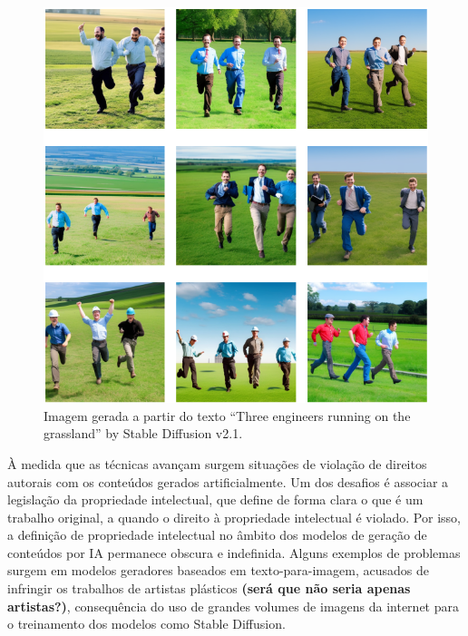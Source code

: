 \begin{figure}
  \centering 
  \includegraphics[scale=0.47]{images_generated_with_text_three_engineers.png}
  \caption{Imagem gerada a partir do texto ``Three engineers running on the grassland'' \space  by Stable Diffusion v2.1.}
  \label{fig:images_of_three_engineers}
\end{figure}



À medida que as técnicas avançam surgem situações de violação de direitos autorais
com os conteúdos gerados artificialmente. Um dos desafios é associar a legislação da propriedade intelectual, 
que define de forma clara o que é um trabalho original, 
a quando o direito à propriedade intelectual é violado. Por isso, a definição de propriedade intelectual no âmbito 
dos modelos de geração de conteúdos por IA permanece obscura e indefinida.
Alguns exemplos de problemas surgem em modelos geradores 
baseados em texto-para-imagem, acusados de infringir os trabalhos de artistas plásticos \textbf{(será que não seria apenas artistas?)}, 
consequência do uso de grandes volumes de imagens da internet para o treinamento dos modelos como Stable Diffusion.






